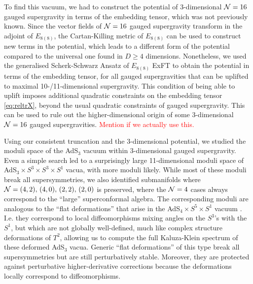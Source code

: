 \documentclass[a4paper, 11pt]{article}
\numberwithin{equation}{section}
\newcommand{\EE}{\ensuremath{E_{8(8)}}\xspace}
\newcommand{\+}{\oplus}
\newcommand{\EM}[1]{\textcolor{red}{#1}}
\begin{document}
To find this vacuum, we had to construct the potential of 3-dimensional ${\cal N}=16$ gauged supergravity in terms of the embedding tensor, which was not previously known. Since the vector fields of ${\cal N}=16$ gauged supergravity transform in the adjoint of $\EE$, the Cartan-Killing metric of $\EE$ can be used to construct new terms in the potential, which leads to a different form of the potential compared to the universal one found in $D \geq 4$ dimensions. Nonetheless, we used the generalised Scherk-Schwarz Ansatz of $\EE$ ExFT \cite{Galli:2022idq} to obtain the potential in terms of the embedding tensor, for all gauged supergravities that can be uplifted to maximal 10-/11-dimensional supergravity. This condition of being able to uplift imposes additional quadratic constraints on the embedding tensor \eqref{eq:reltrX}, beyond the usual quadratic constraints of gauged supergravity. This can be used to rule out the higher-dimensional origin of some 3-dimensional ${\cal N}=16$ gauged supergravities. \EM{Mention if we actually use this.}

Using our consistent truncation and the 3-dimensional potential, we studied the moduli space of the AdS$_3$ vacuum within 3-dimensional gauged supergravity. Even a simple search led to a surprisingly large 11-dimensional moduli space of AdS$_3 \times S^3 \times S^3 \times S^1$ vacua, with more moduli likely. While most of these moduli break all supersymmetries, we also identified submanifolds where ${\cal N}=(4,2),\, (4,0),\, (2,2),\, (2,0)$ is preserved, where the ${\cal N}=4$ cases always correspond to the ``large'' superconformal algebra. The corresponding moduli are analogous to the  ``flat deformations'' that arise in the AdS$_4 \times S^5 \times S^1$ vacuum \cite{Guarino:2020gfe,Guarino:2021hrc,Giambrone:2021zvp,Giambrone:2021wsm}. I.e. they correspond to local diffeomorphisms mixing angles on the $S^3$'s with the $S^1$, but which are not globally well-defined, much like complex structure deformations of $T^2$, allowing us to compute the full Kaluza-Klein spectrum of these deformed AdS$_3$ vacua. Generic ``flat deformations'' of this type break all supersymmetries but are still perturbatively stable. Moreover, they are protected against perturbative higher-derivative corrections because the deformations locally correspond to diffeomorphisms.
\end{document}
